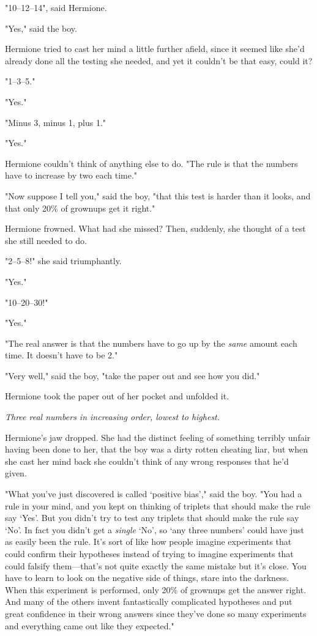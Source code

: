 "10--{12}--{14}", said Hermione.

"Yes," said the boy.

Hermione tried to cast her mind a little further afield, since it seemed like 
she'd already done all the testing she needed, and yet it couldn't be that 
easy, could it?

"1--{3}--{5}."

"Yes."

"Minus 3, minus 1, plus 1."

"Yes."

Hermione couldn't think of anything else to do. "The rule is that the numbers 
have to increase by two each time."

"Now suppose I tell you," said the boy, "that this test is harder than it 
looks, and that only 20\% of grownups get it right."

Hermione frowned. What had she missed? Then, suddenly, she thought of a test 
she still needed to do.

"2--{5}--{8}!" she said triumphantly.

"Yes."

"10--{20}--{30}!"

"Yes."

"The real answer is that the numbers have to go up by the \emph{same} amount 
each time. It doesn't have to be 2."

"Very well," said the boy, "take the paper out and see how you did."

Hermione took the paper out of her pocket and unfolded it.

\emph{Three real numbers in increasing order, lowest to highest.}

Hermione's jaw dropped. She had the distinct feeling of something terribly 
unfair having been done to her, that the boy was a dirty rotten cheating liar, 
but when she cast her mind back she couldn't think of any wrong responses that 
he'd given.

"What you've just discovered is called `positive bias'," said the boy. "You had 
a rule in your mind, and you kept on thinking of triplets that should make the 
rule say `Yes'. But you didn't try to test any triplets that should make the 
rule say `No'. In fact you didn't get a \emph{single} `No', so `any three 
numbers' could have just as easily been the rule. It's sort of like how people 
imagine experiments that could confirm their hypotheses instead of trying to 
imagine experiments that could falsify them---that's not quite exactly the same 
mistake but it's close. You have to learn to look on the negative side of 
things, stare into the darkness. When this experiment is performed, only 20\% of 
grownups get the answer right. And many of the others invent fantastically 
complicated hypotheses and put great confidence in their wrong answers since 
they've done so many experiments and everything came out like they expected."

